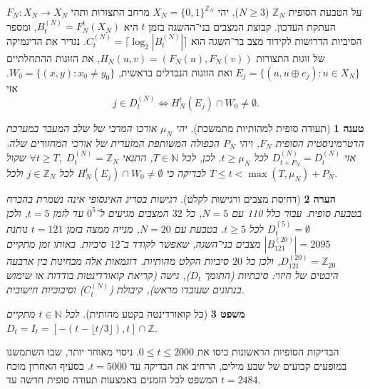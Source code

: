 \documentclass[11pt,a4paper]{article}
\newtheorem{theorem}{משפט}[section]
\newtheorem{proposition}[theorem]{טענה}
\newtheorem{remark}[theorem]{הערה}
\begin{document}
על הטבעת הסופית $\mathbb{Z}_N$ ($N \ge 3$), יהי $X_N = \{0, 1\}^{\mathbb{Z}_N}$ מרחב התצורות ותהי $F_N : X_N \to X_N$ העתקת העדכון. קבוצת המצבים בני־ההשגה בזמן $t$ היא $B_t^{(N)} = F_N^t(X_N)$, ומספר הסיביות הדרושות לקידוד מצב בר־השגה הוא $C_t^{(N)} = \lceil \log_2 |B_t^{(N)}| \rceil$. נגדיר את הדינמיקה של זוגות התצורות $H_N(u, v) = (F_N(u), F_N(v))$, את הזוגות ההתחלתיים $E_j = \{ (u, u \oplus e_j) : u \in X_N \}$ ואת הזוגות הנבדלים בראשית, $W_0 = \{ (x, y) : x_0 \ne y_0 \}$. אזי
\begin{equation}
j \in D_t^{(N)} \iff H_N^t(E_j) \cap W_0 \ne \emptyset.
\end{equation}

\begin{proposition}[תעודה סופית למהותיות מתמשכת]\label{prop:ring_cert}
יהי $\mu_N$ אורכו המרבי של שלב המעבר במערכת הדטרמיניסטית הסופית $F_N$, ויהי $P_N$ הכפולה המשותפת המזערית של אורכי המחזורים שלה. אזי $D_{t+P_N}^{(N)} = D_t^{(N)}$ לכל $t \ge \mu_N$. לכן, לכל $T \in \mathbb{N}$, התנאי $\forall t \ge T,\; D_t^{(N)} = \mathbb{Z}_N$ שקול לבדיקה כי $H_N^t(E_j) \cap W_0 \ne \emptyset$ לכל $j \in \mathbb{Z}_N$ ולכל $T \le t < \max(T, \mu_N) + P_N$.
\end{proposition}

\begin{remark}[דחיסת מצבים ורגישות לקלט]
רגישות בסריג האינסופי אינה נשמרת בהכרח בטבעת סופית. עבור כלל 110 עם $N = 5$, כל $32$ המצבים מגיעים ל־$0^5$ עד לזמן $t = 5$, ולכן $D_t^{(5)} = \emptyset$ לכל $t \ge 5$. בטבעת עם $N = 20$, מנייה ממצה בזמן $t = 121$ נותנת $|B_{121}^{(20)}| = 2095$ מצבים בני־השגה, שאפשר לקודד ב־$12$ סיביות. באותו זמן מתקיים $D_{121}^{(20)} = \mathbb{Z}_{20}$, ולכן כל $20$ סיביות הקלט מהותיות. דוגמאות אלה מבחינות בין ארבעה היבטים של חיזוי: \emph{סיבתיות} (התומך $D_t$), \emph{גישה} (קריאת קואורדינטות בודדות או שימוש בנתונים שעובדו מראש), \emph{קיבולת} ($C_t^{(N)}$) ו\emph{סיבוכיות חישובית}.
\end{remark}

\begin{theorem}[כל קואורדינטה בקטע מהותית]\label{conj:gap_free}
לכל $t \in \mathbb{N}$ מתקיים $D_t = I_t = [-(t - \lfloor t/3 \rfloor), t] \cap \mathbb{Z}$.
\end{theorem}

הבדיקות הסופיות הראשונות כיסו את $0\le t\le2000$. ניסוי מאוחר יותר, שבו השתמשנו במופעים קבועים של שבע מילים, הרחיב את הבדיקה עד $t=5000$. בסעיף האחרון מוכח המשפט לכל הזמנים באמצעות תעודה סופית חדשה עד $t=2484$.

\end{document}
